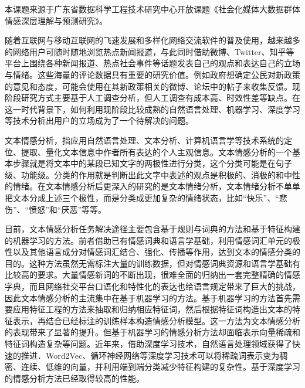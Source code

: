 


本课题来源于广东省数据科学工程技术研究中心开放课题《社会化媒体大数据群体情感深层理解与预测研究》。


随着互联网与移动互联网的飞速发展和多样化网络交流软件的普及使用，越来越多的网络用户可随时随地浏览热点新闻报道，与此同时借助微博、Twitter、知乎等平台上围绕各种新闻报道、热点社会事件等话题发表自己的观点和表达自己的立场与情绪。这些海量的评论数据具有重要的研究价值。例如政府想确定公民对新政策的意见和态度，可能会使用在其新政策相关的微博、论坛中的帖子来收集反馈。现阶段研究方式主要基于人工调查分析，但人工调查有成本高、时效性差等缺点。在这一时代背景下，如何利用现阶段比较成熟的自然语言处理、机器学习、深度学习等技术分析出用户的立场成为了一个待解决的问题。

文本情感分析，指应用自然语言处理、文本分析、计算机语言学等技术系统的定位、提取、量化文本信息中作者所有表达的个人主观信息。文本情感分析的一个基本步骤就是将文本中的某段已知文字的两极性进行分类，这个分类可能是在句子级、功能级。分类的作用就是判断出此文字中表述的观点是积极的、消极的和中性的情绪。在文本情感分析后更深入的研究的是文本情绪分析，文本情绪分析不单单把文本分成上述三个极性，而是分类成更加复杂的情绪状态，比如“快乐”、“悲伤”、“愤怒”和“厌恶”等等。

目前，文本情感分析任务解决途径主要包含基于规则与词典的方法和基于特征构建的机器学习的方法。前者借助已有情感词典和语言学基础，利用情感词汇单元的极性以及其他语言成分对情感词汇结合、强化、传播等作用，达到文本的情感分类的目的。这种方法虽然无需标注大量的训练数据，但对情感词典资源和语言学基础有比较高的要求。大量情感新词的不断出现，很难全面的归纳出一套完整精确的情感字典，而且网络社交平台口语化和特性化的表达也给语言规定带来了巨大的挑战，因此文本情感分析的主流集中在基于机器学习的方法。基于机器学习的方法首先需要应用特征工程的方法来抽取和归纳相应特征词，然后根据特征词构造出文本的特征表示，再结合已经标注的训练样本构造情感分析模型。这一方法为文本情感分析的表现带来了显著的提升。但基于机器学习的情感分析方法却面临表示向量稀疏和特征词构造复杂等问题。近年来，借助深度学习技术，自然语言处理领域获得了快速的推进．Word2Vec、循环神经网络等深度学习技术可以将稀疏词表示变为稠密、连续、低维的向量，并利用端到端分类减少特征构建的复杂性。基于深度学习的情感分析方法已经取得较高的性能。

